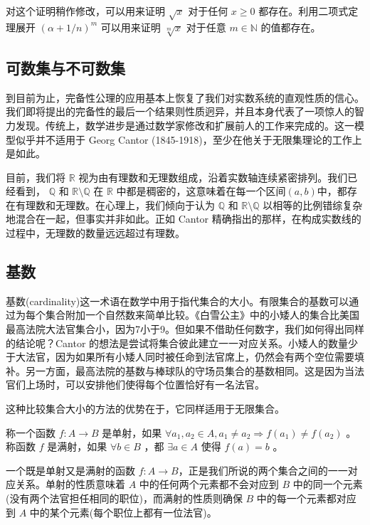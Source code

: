 对这个证明稍作修改，可以用来证明 \(\sqrt{x}\) 对于任何 \(x \geq  0\) 都存在。利用二项式定理展开 \({\left( \alpha  + 1/n\right) }^{m}\) 可以用来证明 \(\sqrt[m]{x}\) 对于任意 \(m \in  \mathbb{N}\) 的值都存在。

\subsection{可数集与不可数集}

到目前为止，完备性公理的应用基本上恢复了我们对实数系统的直观性质的信心。我们即将提出的完备性的最后一个结果则性质迥异，并且本身代表了一项惊人的智力发现。传统上，数学进步是通过数学家修改和扩展前人的工作来完成的。这一模型似乎并不适用于 Georg Cantor (1845-1918)，至少在他关于无限集理论的工作上是如此。

目前，我们将 \(\mathbb{R}\) 视为由有理数和无理数组成，沿着实数轴连续紧密排列。我们已经看到， \(\mathbb{Q}\) 和 \(\mathbb{R}\setminus\mathbb{Q}\) 在 \(\mathbb{R}\) 中都是稠密的，这意味着在每一个区间$(a, b)$中，都存在有理数和无理数。在心理上，我们倾向于认为 \(\mathbb{Q}\) 和 \(\mathbb{R}\setminus\mathbb{Q}\) 以相等的比例错综复杂地混合在一起，但事实并非如此。正如 Cantor 精确指出的那样，在构成实数线的过程中，无理数的数量远远超过有理数。

\subsection{基数}

基数(cardinality)这一术语在数学中用于指代集合的大小。有限集合的基数可以通过为每个集合附加一个自然数来简单比较。《白雪公主》中的小矮人的集合比美国最高法院大法官集合小，因为7小于9。但如果不借助任何数字，我们如何得出同样的结论呢？Cantor 的想法是尝试将集合彼此建立一一对应关系。小矮人的数量少于大法官，因为如果所有小矮人同时被任命到法官席上，仍然会有两个空位需要填补。另一方面，最高法院的基数与棒球队的守场员集合的基数相同。这是因为当法官们上场时，可以安排他们使得每个位置恰好有一名法官。

这种比较集合大小的方法的优势在于，它同样适用于无限集合。

\begin{Def}
  \label{def:1.4.6}
称一个函数 \(f : A \rightarrow  B\) 是单射，如果 \(\forall a_1, a_2\in A, {a}_{1} \neq  {a}_{2}\Rightarrow f\left( {a}_{1}\right)  \neq  f\left( {a}_{2}\right)\) 。称函数 \(f\) 是满射，如果 \(\forall b \in  B\) ，都 \(\exists a \in  A\) 使得 \(f\left( a\right)  = b\) 。
\end{Def}

一个既是单射又是满射的函数 \(f : A \rightarrow  B\)，正是我们所说的两个集合之间的一一对应关系。单射的性质意味着 \(A\) 中的任何两个元素都不会对应到 \(B\) 中的同一个元素(没有两个法官担任相同的职位)，而满射的性质则确保 \(B\) 中的每一个元素都对应到 \(A\) 中的某个元素(每个职位上都有一位法官)。

